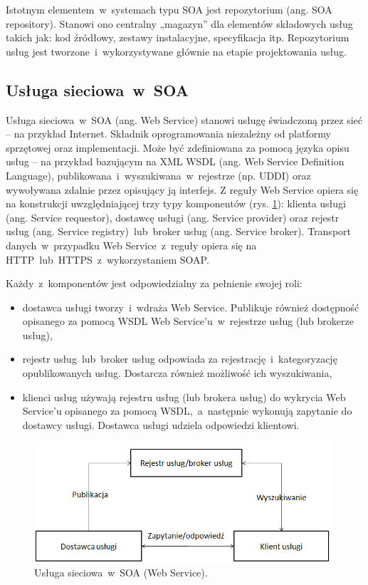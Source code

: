 Istotnym elementem~w~systemach typu SOA jest repozytorium (ang. SOA repository). Stanowi ono centralny „magazyn” dla elementów składowych usług takich jak: kod źródłowy, zestawy instalacyjne, specyfikacja itp. Repozytorium usług jest tworzone~i~wykorzystywane głównie na etapie projektowania usług.

\subsection{Usługa sieciowa~w~SOA}
Usługa sieciowa~w~SOA (ang. Web Service) stanowi usługę świadczoną przez sieć – na przykład Internet. Składnik oprogramowania niezależny od platformy sprzętowej oraz implementacji. Może być zdefiniowana za pomocą języka opisu usług – na przykład bazującym na XML WSDL (ang. Web Service Definition Language), publikowana~i~wyszukiwana~w~rejestrze (np. UDDI) oraz wywoływana zdalnie przez opisujący ją interfejs. 
Z reguły Web Service opiera się na konstrukcji uwzględniającej trzy typy komponentów (rys. \ref{WSArchFunc}): klienta usługi (ang. Service requestor), dostawcę usługi (ang. Service provider) oraz rejestr usług (ang. Service registry)~lub~broker usług (ang. Service broker).  Transport danych~w~przypadku Web Service~z~reguły opiera się na HTTP~lub~HTTPS~z~wykorzystaniem SOAP.

Każdy~z~komponentów jest odpowiedzialny za pełnienie swojej roli:
\begin{itemize}
\item{dostawca usługi tworzy~i~wdraża Web Service. Publikuje również dostępność opisanego za pomocą WSDL Web Service’u~w~rejestrze usług (lub brokerze usług),}
\item{rejestr usług~lub~broker usług odpowiada za rejestrację~i~kategoryzację opublikowanych usług. Dostarcza również możliwość ich wyszukiwania,} 
\item{klienci usług używają rejestru usług (lub brokera usług) do wykrycia Web Service’u opisanego za pomocą WSDL,~a~następnie wykonują zapytanie do dostawcy usługi. Dostawca usługi udziela odpowiedzi klientowi.}
\end{itemize}

\begin{figure}[h!tbp]
\begin{centering}
\includegraphics[width=11cm]{img/web_service.png}
\caption[Usługa sieciowa~w~SOA (Web Service).]{Usługa sieciowa~w~SOA (Web Service). }\label{WSArchFunc}
\end{centering}
\end{figure}

